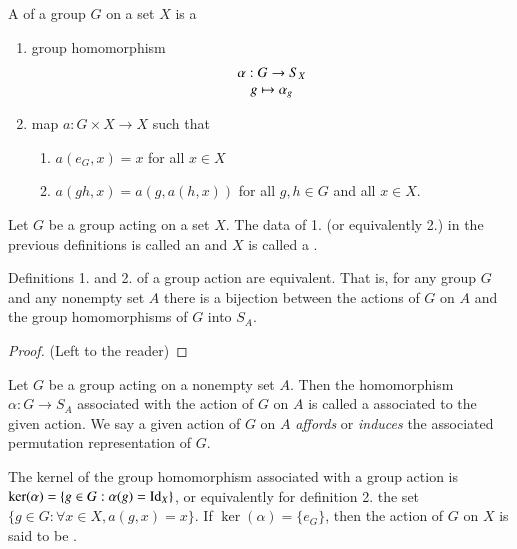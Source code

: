 \documentclass[12pt, a4paper, oneside, openright, titlepage]{book}
\begin{document}
\begin{defn}
        A  of a group $G$ on a set $X$ is a \begin{enumerate}
                \item group homomorphism \begin{equation}
                                \begin{array}{c} \alpha:G\rightarrow S_X \\ g\mapsto \alpha_g \end{array}
                \end{equation}
                \item map $a:G\times X \rightarrow X$ such that \begin{enumerate}
                                \item $a(e_G,x) = x$ for all $x \in X$
                                \item $a(gh,x) = a(g,a(h,x))$ for all $g,h \in G$ and all $x \in X$.
                \end{enumerate}
        \end{enumerate}
\end{defn}

\begin{defn}
        Let $G$ be a group acting on a set $X$. The data of 1. (or equivalently 2.) in the previous definitions is called an  and $X$ is called a .
\end{defn}

\begin{claim}
        Definitions 1. and 2. of a group action are equivalent. That is, for any group $G$ and any nonempty set $A$ there is a bijection between the actions of $G$ on $A$ and the group homomorphisms of $G$ into $S_A$.
\end{claim}
\begin{proof}
        (Left to the reader)
\end{proof}


\begin{defn}
    Let $G$ be a group acting on a nonempty set $A$. Then the homomorphism $\alpha:G\rightarrow S_A$ associated with the action of $G$ on $A$ is called a  associated to the given action. We say a given action of $G$ on $A$ \emph{affords} or \emph{induces} the associated permutation representation of $G$.
\end{defn}


\begin{defn}
        The kernel of the group homomorphism associated with a group action is $\ker(\alpha) = \{g \in G:\alpha(g) = \operatorname{Id}_X\}$, or equivalently for definition 2. the set $\{g \in G: \forall x \in X, a(g,x) = x\}$. If $\ker(\alpha) = \{e_G\}$, then the action of $G$ on $X$ is said to be .
\end{defn}
\end{document}
